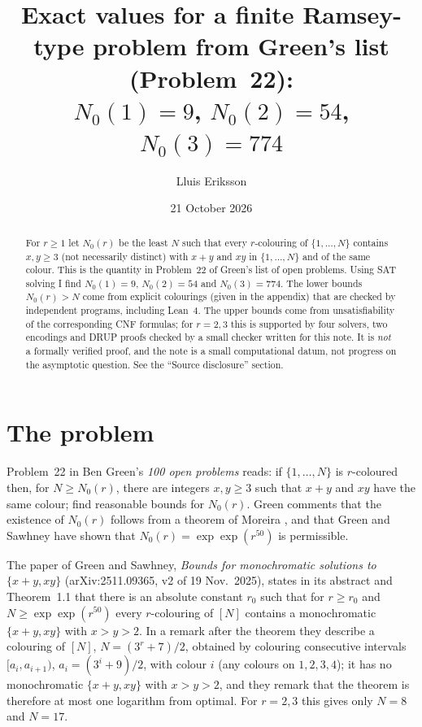 \documentclass[11pt]{article}
\title{Exact values for a finite Ramsey-type problem from Green's list (Problem~22):\\ $N_0(1)=9$, $N_0(2)=54$, $N_0(3)=774$}
\author{Lluis Eriksson}
\date{21 October 2026}
\begin{document}
\sloppy
\maketitle

\begin{abstract}
For $r\ge1$ let $N_0(r)$ be the least $N$ such that every $r$-colouring of $\{1,\dots,N\}$ contains $x,y\ge3$ (not necessarily distinct) with $x+y$ and $xy$ in $\{1,\dots,N\}$ and of the same colour. This is the quantity in Problem~22 of Green's list of open problems. Using SAT solving I find $N_0(1)=9$, $N_0(2)=54$ and $N_0(3)=774$. The lower bounds $N_0(r)>N$ come from explicit colourings (given in the appendix) that are checked by independent programs, including Lean~4. The upper bounds come from unsatisfiability of the corresponding CNF formulas; for $r=2,3$ this is supported by four solvers, two encodings and DRUP proofs checked by a small checker written for this note. It is \emph{not} a formally verified proof, and the note is a small computational datum, not progress on the asymptotic question. See the ``Source disclosure'' section.
\end{abstract}

\section{The problem}
Problem~22 in Ben Green's \emph{100 open problems} \cite{green100} reads: if $\{1,\dots,N\}$ is $r$-coloured then, for $N\ge N_0(r)$, there are integers $x,y\ge3$ such that $x+y$ and $xy$ have the same colour; find reasonable bounds for $N_0(r)$. Green comments that the existence of $N_0(r)$ follows from a theorem of Moreira \cite{moreira}, and that Green and Sawhney \cite{gs} have shown that $N_0(r)=\exp\exp(r^{50})$ is permissible.

The paper of Green and Sawhney, \emph{Bounds for monochromatic solutions to $\{x+y,xy\}$} (arXiv:2511.09365, v2 of 19 Nov.\ 2025), states in its abstract and Theorem~1.1 that there is an absolute constant $r_0$ such that for $r\ge r_0$ and $N\ge\exp\exp(r^{50})$ every $r$-colouring of $[N]$ contains a monochromatic $\{x+y,xy\}$ with $x>y>2$. In a remark after the theorem they describe a colouring of $[N]$, $N=(3^r+7)/2$, obtained by colouring consecutive intervals $[a_i,a_{i+1})$, $a_i=(3^i+9)/2$, with colour $i$ (any colours on $1,2,3,4$); it has no monochromatic $\{x+y,xy\}$ with $x>y>2$, and they remark that the theorem is therefore at most one logarithm from optimal. For $r=2,3$ this gives only $N=8$ and $N=17$.
\end{document}
